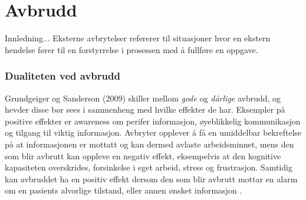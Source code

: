 \section{Avbrudd}
\label{chp: avbrudd} 
Innledning...
Eksterne avbrytelser refererer til situasjoner hvor en ekstern hendelse fører til en forstyrrelse i prosessen med å fullføre en oppgave.

\subsubsection{Dualiteten ved avbrudd}
Grundgeiger og Sanderson (2009) skiller mellom \emph{gode} og \emph{dårlige} avbrudd, og hevder disse bør sees i sammenheng med hvilke effekter de har. Eksempler på positive effekter er awareness om perifer informasjon, øyeblikkelig kommunikasjon og tilgang til viktig informasjon. Avbryter opplever å få en umiddelbar bekreftelse på at informasjonen er mottatt og kan dermed avlaste arbeidsminnet, mens den som blir avbrutt kan oppleve en negativ effekt, eksempelvis at den kognitive kapasiteten overskrides, forsinkelse i eget arbeid, stress og frustrasjon. Samtidig kan avbruddet ha en positiv effekt dersom den som blir avbrutt mottar en alarm om en pasients alvorlige tilstand, eller annen ønsket informasjon \cite{Grundgeiger09}.

